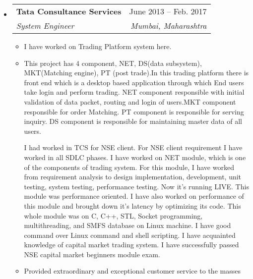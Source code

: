 \documentclass[letterpaper,12pt]{article}[leftmargin=*]
\makeatletter
\def \entryspacing {-0pt}
\newcommand{\resumeEntryStart}{\begin{itemize}[leftmargin=2.5mm]}
\newcommand{\resumeEntryEnd}{\end{itemize}\vspace{\entryspacing}}
\newcommand{\resumeItemListStart}{\begin{itemize}[leftmargin=4.5mm]}
\newcommand{\resumeItemListEnd}{\end{itemize}}
\newcommand{\resumeItem}[1]{
  \item\small{
    {#1 \vspace{-2pt}}
  }
}
\newcommand{\resumeEntryTSDL}[4]{
  \vspace{-1pt}\item[]
    \begin{tabular*}{0.97\textwidth}{l@{\extracolsep{\fill}}r}
      \textbf{\color{primary}#1} & {\firabook\color{accent}\small#2} \\
      \textit{\color{accent}\small#3} & \textit{\color{accent}\small#4} \\
    \end{tabular*}\vspace{-6pt}
}
\makeatother
\begin{document}
  \resumeEntryStart
    \resumeEntryTSDL
      {Tata Consultance Services}{June 2013 -- Feb. 2017}
      {System Engineer}{Mumbai, Maharashtra}
    \resumeItemListStart
        \resumeItem {I have worked on Trading Platform system here.}
        \resumeItem {This project has 4 component, NET, DS(data subsystem), MKT(Matching engine), PT (post trade).In this trading platform there is front end which is a desktop based application through which End users take login and perform trading. NET component responsible with initial validation of data packet, routing and login of users.MKT component responsible for order Matching. PT component is responsible for serving inquiry. DS component is responsible for maintaining master data of all users.

I had worked in TCS for NSE client.
For NSE client requirement I have worked in all SDLC phases. I have worked on NET module, which is one of the components of trading system. For this module, I have worked from requirement analysis to design implementation, development, unit testing, system testing, performance testing. Now it’s running LIVE. This module was performance oriented. I have also worked on performance of this module and brought down it's latency by optimizing its code.
This whole module was on C, C++, STL, Socket programming, multithreading, and SMFS database on Linux machine. I have good command over Linux command and shell scripting. I have acquainted knowledge of capital market trading system. I have successfully passed NSE capital market beginners module exam.
}
        \resumeItem {Provided extraordinary and exceptional customer service to the masses}
    \resumeItemListEnd
  \resumeEntryEnd
\end{document}

